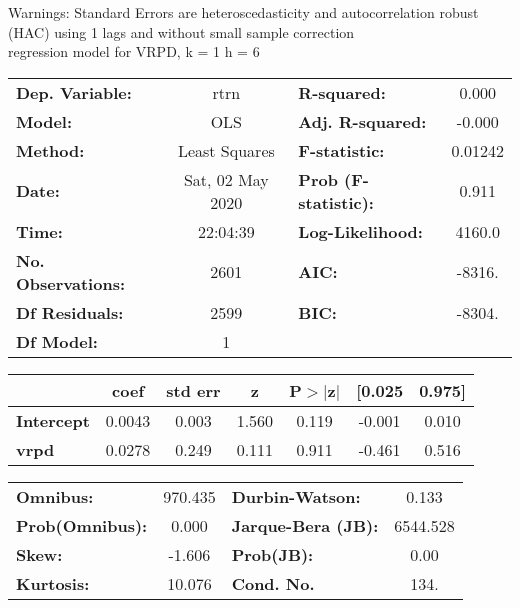 Warnings: \newline
 [1] Standard Errors are heteroscedasticity and autocorrelation robust (HAC) using 1 lags and without small sample correction\\ 

regression model for VRPD, k = 1 h = 6\begin{center}
\begin{tabular}{lclc}
\toprule
\textbf{Dep. Variable:}    &       rtrn       & \textbf{  R-squared:         } &     0.000   \\
\textbf{Model:}            &       OLS        & \textbf{  Adj. R-squared:    } &    -0.000   \\
\textbf{Method:}           &  Least Squares   & \textbf{  F-statistic:       } &   0.01242   \\
\textbf{Date:}             & Sat, 02 May 2020 & \textbf{  Prob (F-statistic):} &    0.911    \\
\textbf{Time:}             &     22:04:39     & \textbf{  Log-Likelihood:    } &    4160.0   \\
\textbf{No. Observations:} &        2601      & \textbf{  AIC:               } &    -8316.   \\
\textbf{Df Residuals:}     &        2599      & \textbf{  BIC:               } &    -8304.   \\
\textbf{Df Model:}         &           1      & \textbf{                     } &             \\
\bottomrule
\end{tabular}
\begin{tabular}{lcccccc}
                   & \textbf{coef} & \textbf{std err} & \textbf{z} & \textbf{P$> |$z$|$} & \textbf{[0.025} & \textbf{0.975]}  \\
\midrule
\textbf{Intercept} &       0.0043  &        0.003     &     1.560  &         0.119        &       -0.001    &        0.010     \\
\textbf{vrpd}      &       0.0278  &        0.249     &     0.111  &         0.911        &       -0.461    &        0.516     \\
\bottomrule
\end{tabular}
\begin{tabular}{lclc}
\textbf{Omnibus:}       & 970.435 & \textbf{  Durbin-Watson:     } &    0.133  \\
\textbf{Prob(Omnibus):} &   0.000 & \textbf{  Jarque-Bera (JB):  } & 6544.528  \\
\textbf{Skew:}          &  -1.606 & \textbf{  Prob(JB):          } &     0.00  \\
\textbf{Kurtosis:}      &  10.076 & \textbf{  Cond. No.          } &     134.  \\
\bottomrule
\end{tabular}
\end{center}

